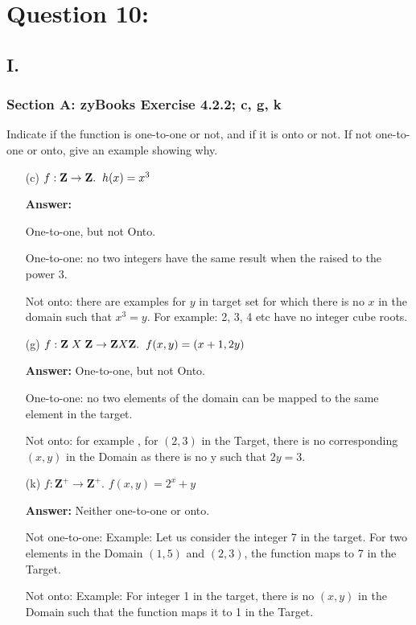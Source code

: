 \documentclass[14pt]{extreport}
\newcommand{\answer}[0]{\medskip \textbf{Answer:} \medskip}
\begin{document}
\section*{Question 10:}

\subsection*{I.}

\subsubsection*{Section A: zyBooks Exercise 4.2.2; c, g, k}
    
Indicate if the function is one-to-one or not, and if it is onto or not. If not one-to-one or onto, give an example showing why. 

\begin{enumerate}
    \item[(c)] $f: \textbf{Z} \to \textbf{Z}. \hspace{2mm} h(x) = x^{3}$
    
        \answer

            One-to-one, but not Onto.
            
            One-to-one: no two integers have the same result when the raised to the power 3. 
            
            Not onto: there are examples for $y$ in target set for which there is no $x$ in the domain such that $x^{3} = y$. For example: 2, 3, 4 etc have no integer cube roots.
    \newline
    \item[(g)] $f: \textbf{Z}\hspace{1mm} X \hspace{1mm}\textbf{Z} \to \textbf{Z} X \textbf{Z}. \hspace{2mm} f(x,y) = (x+1, 2y)$
    
        \answer
        One-to-one, but not Onto. 
        
        One-to-one: no two elements of the domain can be mapped to the same element in the target. 
        
        Not onto: for example , for $\left(2,3\right)$ in the Target, there is no corresponding $\left(x,y\right)$ in the Domain as there is no y such that $2y = 3$. 
    \newline
    
    \item[(k)] $f: \textbf{Z} ^{+} \to \textbf{Z} ^{+}$.\hspace{1mm} $f(x,y) = 2^{x} + y$
    
        \answer
        Neither one-to-one or onto. 
        
        Not one-to-one: Example: Let us consider the integer 7 in the target. For two elements in the Domain $\left(1,5\right)$ and $\left(2,3\right)$, the function maps to 7 in the Target. 
        
        Not onto: Example: For integer 1 in the target, there is no $\left(x,y\right)$ in the Domain such that the function maps it to 1 in the Target. 

\end{enumerate}
\end{document}
